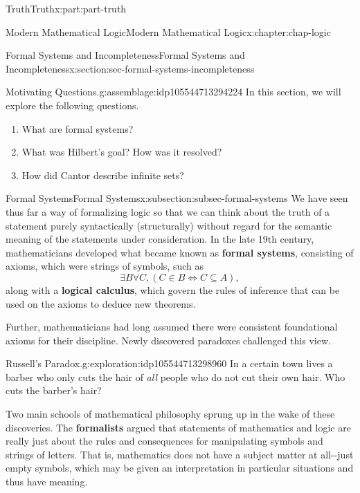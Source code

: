 \documentclass[oneside,10pt,]{book}
\newcommand{\terminology}[1]{\textbf{#1}}
\numberwithin{equation}{section}
\begin{document}
\begin{partptx}{Truth}{}{Truth}{}{}{x:part:part-truth}
\begin{chapterptx}{Modern Mathematical Logic}{}{Modern Mathematical Logic}{}{}{x:chapter:chap-logic}
\typeout{************************************************}
%
\begin{sectionptx}{Formal Systems and Incompleteness}{}{Formal Systems and Incompleteness}{}{}{x:section:sec-formal-systems-incompleteness}
\begin{assemblage}{Motivating Questions.}{g:assemblage:idp105544713294224}%
In this section, we will explore the following questions. %
\begin{enumerate}
\item{}What are formal systems?%
\item{}What was Hilbert's goal? How was it resolved?%
\item{}How did Cantor describe infinite sets?%
\end{enumerate}
%
\end{assemblage}
%
%
\typeout{************************************************}
\typeout{************************************************}
%
\begin{subsectionptx}{Formal Systems}{}{Formal Systems}{}{}{x:subsection:subsec-formal-systems}
We have seen thus far a way of formalizing logic so that we can think about the truth of a statement purely syntactically (structurally) without regard for the semantic meaning of the statements under consideration. In the late 19th century, mathematicians developed what became known as \terminology{formal systems}, consisting of axioms, which were strings of symbols, such as%
\begin{equation*}
\exists B \forall C, (C\in B \Leftrightarrow C\subseteq A),
\end{equation*}
along with a \terminology{logical calculus}, which govern the rules of inference that can be used on the axioms to deduce new theorems.%
\par
Further, mathematicians had long assumed there were consistent foundational axioms for their discipline. Newly discovered paradoxes challenged this view.%
\begin{exploration}{Russell's Paradox.}{g:exploration:idp105544713298960}%
In a certain town lives a barber who only cuts the hair of \emph{all} people who do not cut their own hair. Who cuts the barber's hair?%
\end{exploration}%
Two main schools of mathematical philosophy sprung up in the wake of these discoveries. The \terminology{formalists} argued that statements of mathematics and logic are really just about the rules and consequences for manipulating symbols and strings of letters. That is, mathematics does not have a subject matter at all-{}-{}just empty symbols, which may be given an interpretation in particular situations and thus have meaning.%

\end{subsectionptx}
\end{sectionptx}
\end{chapterptx}
\end{partptx}
\end{document}
